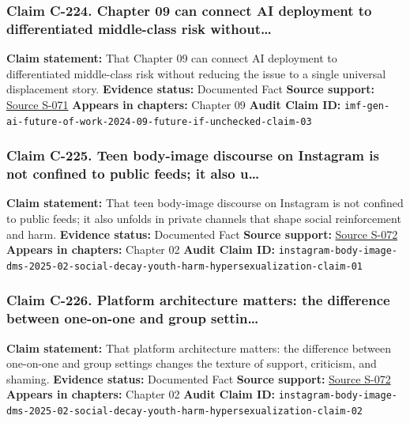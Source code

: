 \documentclass[
  american,
  11pt,
  letterpaper,
]{article}
\begin{document}
\subsubsection{Claim C-224. Chapter 09 can connect AI deployment to
differentiated middle-class risk
without\ldots{}}\label{claim-c-224-chapter-09-can-connect-ai-deployment-to-differentiated-middle-class-risk-without}

\textbf{Claim statement:} That Chapter 09 can connect AI deployment to
differentiated middle-class risk without reducing the issue to a single
universal displacement story. \textbf{Evidence status:} Documented Fact
\textbf{Source support:}
\hyperref[source-s-071-gen-ai-artificial-intelligence-and-the-future-of-work]{Source
S-071} \textbf{Appears in chapters:} Chapter 09 \textbf{Audit Claim ID:}
\texttt{imf-gen-ai-future-of-work-2024-09-future-if-unchecked-claim-03}

\subsubsection{Claim C-225. Teen body-image discourse on Instagram is
not confined to public feeds; it also
u\ldots{}}\label{claim-c-225-teen-body-image-discourse-on-instagram-is-not-confined-to-public-feeds-it-also-u}

\textbf{Claim statement:} That teen body-image discourse on Instagram is
not confined to public feeds; it also unfolds in private channels that
shape social reinforcement and harm. \textbf{Evidence status:}
Documented Fact \textbf{Source support:}
\hyperref[source-s-072-unfiltered-how-teens-engage-in-body-image-and-shaming-discussions-via-instagram-direct-messages-dms]{Source
S-072} \textbf{Appears in chapters:} Chapter 02 \textbf{Audit Claim ID:}
\texttt{instagram-body-image-dms-2025-02-social-decay-youth-harm-hypersexualization-claim-01}

\subsubsection{Claim C-226. Platform architecture matters: the
difference between one-on-one and group
settin\ldots{}}\label{claim-c-226-platform-architecture-matters-the-difference-between-one-on-one-and-group-settin}

\textbf{Claim statement:} That platform architecture matters: the
difference between one-on-one and group settings changes the texture of
support, criticism, and shaming. \textbf{Evidence status:} Documented
Fact \textbf{Source support:}
\hyperref[source-s-072-unfiltered-how-teens-engage-in-body-image-and-shaming-discussions-via-instagram-direct-messages-dms]{Source
S-072} \textbf{Appears in chapters:} Chapter 02 \textbf{Audit Claim ID:}
\texttt{instagram-body-image-dms-2025-02-social-decay-youth-harm-hypersexualization-claim-02}
\end{document}
